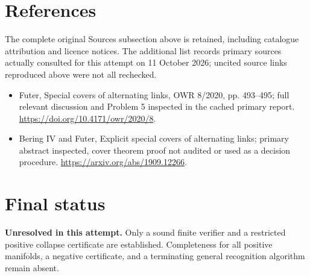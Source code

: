 \documentclass[11pt]{article}
\begin{document}
\section{References}
The complete original Sources subsection above is retained, including catalogue attribution and licence notices. The additional list records primary sources actually consulted for this attempt on 11 October 2026; uncited source links reproduced above were not all rechecked.
\begin{itemize}
\item Futer, Special covers of alternating links, OWR 8/2020, pp. 493--495; full relevant discussion and Problem 5 inspected in the cached primary report. \url{https://doi.org/10.4171/owr/2020/8}.
\item Bering IV and Futer, Explicit special covers of alternating links; primary abstract inspected, cover theorem proof not audited or used as a decision procedure. \url{https://arxiv.org/abs/1909.12266}.
\end{itemize}
\section{Final status}
\textbf{Unresolved in this attempt.} Only a sound finite verifier and a restricted positive collapse certificate are established. Completeness for all positive manifolds, a negative certificate, and a terminating general recognition algorithm remain absent.
\end{document}
